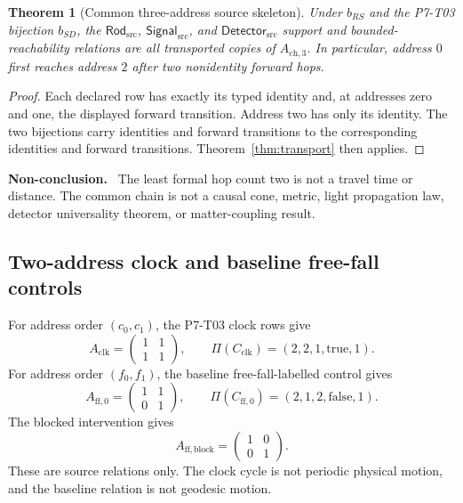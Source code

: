 \documentclass[11pt]{article}
\newtheorem{theorem}{Theorem}
\newenvironment{nonconclusion}{\par\smallskip\noindent\textbf{Non-conclusion.}\ }{\par\smallskip}
\newcommand{\Src}{\mathrm{src}}
\newcommand{\Rod}{\mathsf{Rod}_{\Src}}
\newcommand{\Signal}{\mathsf{Signal}_{\Src}}
\newcommand{\Detector}{\mathsf{Detector}_{\Src}}
\begin{document}
\begin{theorem}[Common three-address source skeleton]
\label{thm:subfamily}
Under \(b_{RS}\) and the P7-T03 bijection \(b_{SD}\), the \(\Rod\),
\(\Signal\), and \(\Detector\) support and bounded-reachability relations are
all transported copies of \(A_{\mathrm{ch},3}\).  In particular, address
\(0\) first reaches address \(2\) after two nonidentity forward hops.
\end{theorem}

\begin{proof}
Each declared row has exactly its typed identity and, at addresses zero and
one, the displayed forward transition.  Address two has only its identity.
The two bijections carry identities and forward transitions to the
corresponding identities and forward transitions.  Theorem~\ref{thm:transport}
then applies.
\end{proof}

\begin{nonconclusion}
The least formal hop count two is not a travel time or distance.  The common
chain is not a causal cone, metric, light propagation law, detector
universality theorem, or matter-coupling result.
\end{nonconclusion}

\subsection{Two-address clock and baseline free-fall controls}

For address order \((c_0,c_1)\), the P7-T03 clock rows give
\[
 A_{\mathrm{clk}}=
 \begin{pmatrix}
 1&1\\
 1&1
 \end{pmatrix},
 \qquad
 \Pi(C_{\mathrm{clk}})=(2,2,1,\mathrm{true},1).
\]
For address order \((f_0,f_1)\), the baseline free-fall-labelled control
gives
\[
 A_{\mathrm{ff},0}=
 \begin{pmatrix}
 1&1\\
 0&1
 \end{pmatrix},
 \qquad
 \Pi(C_{\mathrm{ff},0})=(2,1,2,\mathrm{false},1).
\]
The blocked intervention gives
\[
 A_{\mathrm{ff},\mathrm{block}}=
 \begin{pmatrix}
 1&0\\
 0&1
 \end{pmatrix}.
\]
These are source relations only.  The clock cycle is not periodic physical
motion, and the baseline relation is not geodesic motion.
\end{document}
